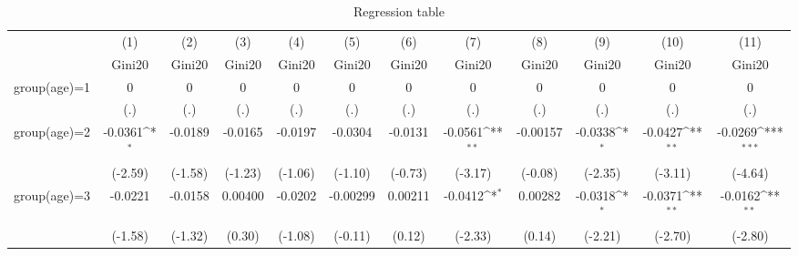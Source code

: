 \begin{table}[htbp]\centering
\def\sym#1{\ifmmode^{#1}\else\(^{#1}\)\fi}
\caption{Regression table\label{reg1}}
\begin{tabular}{l*{11}{c}}
\hline\hline
                    &\multicolumn{1}{c}{(1)}&\multicolumn{1}{c}{(2)}&\multicolumn{1}{c}{(3)}&\multicolumn{1}{c}{(4)}&\multicolumn{1}{c}{(5)}&\multicolumn{1}{c}{(6)}&\multicolumn{1}{c}{(7)}&\multicolumn{1}{c}{(8)}&\multicolumn{1}{c}{(9)}&\multicolumn{1}{c}{(10)}&\multicolumn{1}{c}{(11)}\\
                    &\multicolumn{1}{c}{Gini20}&\multicolumn{1}{c}{Gini20}&\multicolumn{1}{c}{Gini20}&\multicolumn{1}{c}{Gini20}&\multicolumn{1}{c}{Gini20}&\multicolumn{1}{c}{Gini20}&\multicolumn{1}{c}{Gini20}&\multicolumn{1}{c}{Gini20}&\multicolumn{1}{c}{Gini20}&\multicolumn{1}{c}{Gini20}&\multicolumn{1}{c}{Gini20}\\
\hline
group(age)=1        &           0         &           0         &           0         &           0         &           0         &           0         &           0         &           0         &           0         &           0         &           0         \\
                    &         (.)         &         (.)         &         (.)         &         (.)         &         (.)         &         (.)         &         (.)         &         (.)         &         (.)         &         (.)         &         (.)         \\
[1em]
group(age)=2        &     -0.0361\sym{*}  &     -0.0189         &     -0.0165         &     -0.0197         &     -0.0304         &     -0.0131         &     -0.0561\sym{**} &    -0.00157         &     -0.0338\sym{*}  &     -0.0427\sym{**} &     -0.0269\sym{***}\\
                    &     (-2.59)         &     (-1.58)         &     (-1.23)         &     (-1.06)         &     (-1.10)         &     (-0.73)         &     (-3.17)         &     (-0.08)         &     (-2.35)         &     (-3.11)         &     (-4.64)         \\
[1em]
group(age)=3        &     -0.0221         &     -0.0158         &     0.00400         &     -0.0202         &    -0.00299         &     0.00211         &     -0.0412\sym{*}  &     0.00282         &     -0.0318\sym{*}  &     -0.0371\sym{**} &     -0.0162\sym{**} \\
                    &     (-1.58)         &     (-1.32)         &      (0.30)         &     (-1.08)         &     (-0.11)         &      (0.12)         &     (-2.33)         &      (0.14)         &     (-2.21)         &     (-2.70)         &     (-2.80)         \\

\end{tabular}
\end{table}
